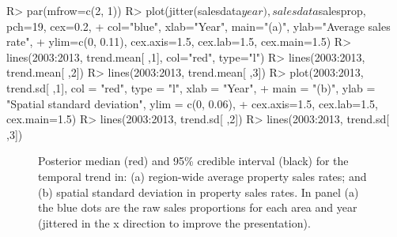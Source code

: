 \documentclass[article, nojss]{jss}
\begin{document}
\begin{CodeInput}
R> par(mfrow=c(2, 1))
R> plot(jitter(salesdata$year), salesdata$salesprop, pch=19, cex=0.2, 
+    col="blue", xlab="Year", main="(a)", ylab="Average sales rate", 
+    ylim=c(0, 0.11), cex.axis=1.5, cex.lab=1.5, cex.main=1.5)
R> lines(2003:2013, trend.mean[ ,1], col="red", type="l")
R> lines(2003:2013, trend.mean[ ,2])
R> lines(2003:2013, trend.mean[ ,3])
R> plot(2003:2013, trend.sd[ ,1], col = "red", type = "l", xlab = "Year", 
+    main = "(b)", ylab = "Spatial standard deviation", ylim = c(0, 0.06),
+    cex.axis=1.5, cex.lab=1.5, cex.main=1.5)
R> lines(2003:2013, trend.sd[ ,2])
R> lines(2003:2013, trend.sd[ ,3])
\end{CodeInput}



\begin{figure}
\centering 
{}
\caption{Posterior median (red) and 95\% credible interval (black) for the temporal trend in: (a) region-wide average property sales rates; and (b) spatial standard deviation in property sales rates. In panel (a) the blue dots are the raw sales proportions for each area and year (jittered in the x direction to improve the presentation).\label{salestrend}}
\end{figure} 
\end{document}
